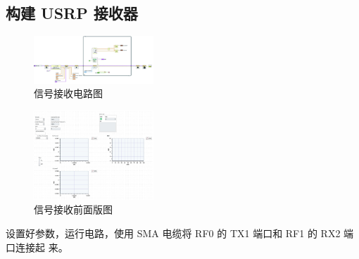 \documentclass{../source/Experiment}
\begin{document}
        \subsection{构建 USRP 接收器}
        \begin{figure}[H]
            \centering
            \includegraphics[width = 0.4\textwidth]{lab9/Rx-a.jpg}
            \caption{信号接收电路图}
        \end{figure}
        \begin{figure}[H]
            \centering
            \includegraphics[width = 0.4\textwidth]{lab9/Rx-b.jpg}
            \caption{信号接收前面版图}
        \end{figure}
        
        设置好参数，运行电路，使用 SMA 电缆将 RF0 的 TX1 端口和 RF1 的 RX2 端口连接起 来。
\end{document}
